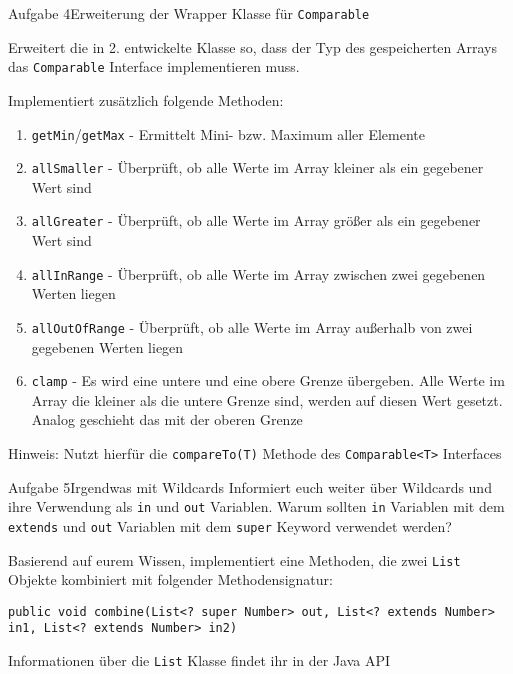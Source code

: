 \begin{frame}[allowframebreaks]{Aufgabe 4}{Erweiterung der Wrapper Klasse für \texttt{Comparable}}

    Erweitert die in 2. entwickelte Klasse so, dass der Typ des gespeicherten Arrays das \texttt{Comparable} Interface implementieren muss.

    Implementiert zusätzlich folgende Methoden:
    \begin{enumerate}
        \item \texttt{getMin}/\texttt{getMax} - Ermittelt Mini- bzw. Maximum aller Elemente
        \item \texttt{allSmaller} - Überprüft, ob alle Werte im Array kleiner als ein gegebener Wert sind
        \item \texttt{allGreater} - Überprüft, ob alle Werte im Array größer als ein gegebener Wert sind
        \item \texttt{allInRange} - Überprüft, ob alle Werte im Array zwischen zwei gegebenen Werten liegen
        \item \texttt{allOutOfRange} - Überprüft, ob alle Werte im Array außerhalb von zwei gegebenen Werten liegen
        \item \texttt{clamp} - Es wird eine untere und eine obere Grenze übergeben. Alle Werte im Array die kleiner als die untere Grenze sind, werden auf diesen Wert gesetzt. Analog geschieht das mit der oberen Grenze
    \end{enumerate}

    Hinweis: Nutzt hierfür die \texttt{compareTo(T)} Methode des \texttt{Comparable<T>} Interfaces
\end{frame}

\begin{frame}[fragile]{Aufgabe 5}{Irgendwas mit Wildcards}
Informiert euch weiter über Wildcards und ihre Verwendung als \texttt{in} und \texttt{out} Variablen. 
Warum sollten \texttt{in} Variablen mit dem \texttt{extends} und \texttt{out} Variablen mit dem \texttt{super} Keyword verwendet werden?

Basierend auf eurem Wissen, implementiert eine Methoden, die zwei \texttt{List} Objekte kombiniert mit folgender Methodensignatur:

\lstset{style=java}
\begin{lstlisting}
public void combine(List<? super Number> out, List<? extends Number> in1, List<? extends Number> in2)
\end{lstlisting}

Informationen über die \texttt{List} Klasse findet ihr in der Java API
\end{frame}